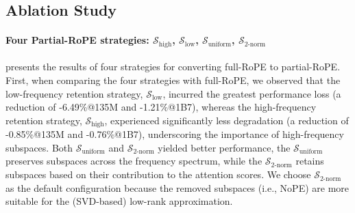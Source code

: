 \subsection{Ablation Study}
\label{ssec:ablation_study}


\paragraph{Four Partial-RoPE strategies: $\mathcal{S}_{\text{high}}$, $\mathcal{S}_{\text{low}}$, $\mathcal{S}_{\text{uniform}}$, $\mathcal{S}_{\text{2-norm}}$}
 presents the results of four strategies for converting full-RoPE to partial-RoPE. %
First, when comparing the four strategies with full-RoPE, we observed that the low-frequency retention strategy, \(\mathcal{S}_{\text{low}}\), incurred the greatest performance loss (a reduction of -6.49\%@135M and -1.21\%@1B7), whereas the high-frequency retention strategy, \(\mathcal{S}_{\text{high}}\), experienced significantly less degradation (a reduction of -0.85\%@135M and -0.76\%@1B7), underscoring the importance of high-frequency subspaces. Both \(\mathcal{S}_{\text{uniform}}\) and \(\mathcal{S}_{2\text{-norm}}\) yielded better performance, the \(\mathcal{S}_{\text{uniform}}\) preserves subspaces across the frequency spectrum, while the \(\mathcal{S}_{2\text{-norm}}\) retains subspaces based on their contribution to the attention scores. 
We choose \( \mathcal{S}_{2\text{-norm}} \) as the default configuration because the removed subspaces (i.e., NoPE) are more suitable for the (SVD-based) low-rank approximation.

